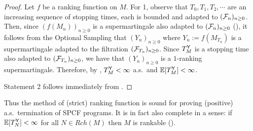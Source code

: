\begin{proof}
Let $f$ be a ranking function on $M$.
For 1, observe that $T_0, T_1, T_2, \cdots$ are an increasing sequence of stopping times, each is bounded  and adapted to $(\mathcal{F}_n)_{n \geq 0}$.
Then, since $(f(M_n))_{n \geq 0}$ is a supermartingale also adapted to $(\mathcal{F}_n)_{n \geq 0}$ (),
it follows from the Optional Sampling  that $(Y_n)_{n \geq 0}$ where $Y_n := f(M_{T_n})$ is a supermartingale adapted to the filtration $(\mathcal{F}_{T_n})_{n \geq 0}$.
Since $T_M^{\mathsf{Y}}$ is a stopping time also adapted to $(\mathcal{F}_{T_n})_{n \geq 0}$, we have that $(Y_n)_{n \geq 0}$ is a $1$-ranking supermartingale.
Therefore, by , $T^{\mathsf{Y}}_M < \infty$ a.s.~and $\mathbb{E}[T^{\mathsf{Y}}_M] < \infty$.

Statement 2 follows immediately from .
\end{proof}

Thus the method of (strict) ranking function is sound for proving (positive) a.s.~termination of SPCF programs.
It is in fact also complete in a sense: if $\mathbb{E}[T^{\mathsf{Y}}_N] < \infty$ for all $N \in \mathit{Rch}(M)$ then $M$ is rankable ().
